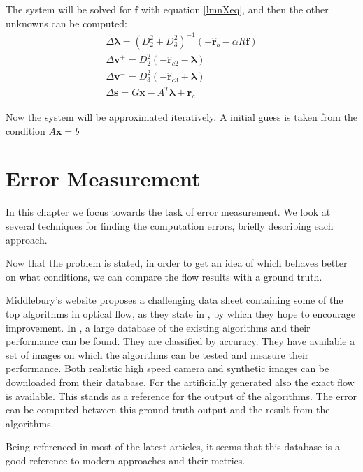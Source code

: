 \documentclass[12pt,a4paper,twoside]{report}
\begin{document}
{ The system will be solved for $\boldsymbol{f}$ with equation  \ref{lmnXeq}, and then the other unknowns can be computed:
 \begin{equation} \label{lmnReq}
 	\begin{split}
 	\Delta\boldsymbol{\lambda} = ( D_2^{2} +  D_3^{2} )^{-1}
 	(-\hat{\boldsymbol{r}}_{b} - \alpha R \boldsymbol{f})\\
 	\Delta\boldsymbol{v}^+ = D_2^{2}(-\hat{\boldsymbol{r}}_{c2} - \boldsymbol{\lambda})\\
	\Delta\boldsymbol{v}^- = D_3^{2}(-\hat{\boldsymbol{r}}_{c3} + \boldsymbol{\lambda})\\
 	\Delta\boldsymbol{s} =  G  \boldsymbol{x} -  A^T\boldsymbol{\lambda} + \boldsymbol{r}_c
 	\end{split}
 \end{equation}

 Now the system will be approximated iteratively. A initial guess is taken from the condition $A\boldsymbol{x} = b$ 



\section{Error Measurement}

In this chapter we focus towards the task of error measurement. We look at several techniques for finding the computation errors, briefly describing each approach. 

Now that the problem is stated, in order to get an idea of which behaves better on what conditions, we can compare the flow results with a ground truth.

 Middlebury's website\cite{middleburry} proposes a challenging data sheet containing some of the top algorithms in optical flow, as they state in \cite{baker2011database}, by which they hope to encourage improvement. In \cite{middleburry}, a large database of the existing algorithms and their performance can be found. They are classified by accuracy.
They have available a set of images on which the algorithms can be tested and measure their performance. Both realistic high speed camera and synthetic images can be downloaded from their database. For the artificially generated also the exact flow is available. This stands as a reference for the output of the algorithms. The error can be computed between this ground truth output and the result from the algorithms.

 Being referenced in most of the latest articles, it seems that this database is a good reference to modern approaches and their metrics.

}
\end{document}

